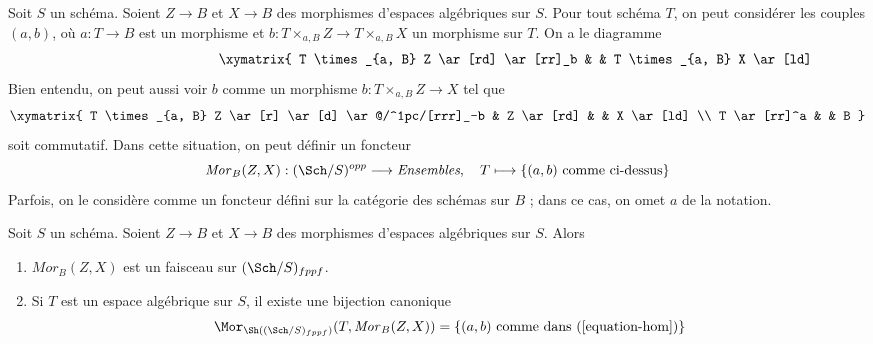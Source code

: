 \medskip\noindent
Soit $S$ un schéma. Soient $Z \to B$ et $X \to B$ des morphismes
d'espaces algébriques sur $S$. Pour tout schéma $T$, on peut considérer les couples
$(a, b)$, où $a : T \to B$
est un morphisme et $b : T \times_{a, B} Z \to T \times_{a, B} X$
un morphisme sur $T$. On a le diagramme
\begin{equation}
\label{equation-hom}
\vcenter{
\xymatrix{
T \times_{a, B} Z \ar[rd] \ar[rr]_b & &
T \times_{a, B} X \ar[ld] & Z \ar[rd] & & X \ar[ld] \\
& T \ar[rrr]^a & & & B
}
}
\end{equation}
Bien entendu, on peut aussi voir $b$ comme un morphisme
$b : T \times_{a, B} Z \to X$ tel que
$$
\xymatrix{
T \times_{a, B} Z \ar[r] \ar[d] \ar@/^1pc/[rrr]_-b &
Z \ar[rd] & & X \ar[ld] \\
T \ar[rr]^a & & B
}
$$
soit commutatif. Dans cette situation, on peut définir un foncteur
\begin{equation}
\label{equation-hom-functor}
\mathit{Mor}_B(Z, X) : (\Sch/S)^{opp} \longrightarrow \textit{Ensembles},
\quad
T \longmapsto \{(a, b)\text{ comme ci-dessus}\}
\end{equation}
Parfois, on le considère comme un foncteur défini sur la catégorie
des schémas sur $B$ ; dans ce cas, on omet $a$ de la notation.

\begin{lemma}
\label{lemma-hom-functor-sheaf}
Soit $S$ un schéma. Soient $Z \to B$ et $X \to B$ des morphismes
d'espaces algébriques sur $S$. Alors
\begin{enumerate}
\item $\mathit{Mor}_B(Z, X)$ est un faisceau sur
$(\Sch/S)_{fppf}$.
\item Si $T$ est un espace algébrique sur $S$, il existe une
bijection canonique
$$
\Mor_{\Sh((\Sch/S)_{fppf})}(T, \mathit{Mor}_B(Z, X))
=
\{(a, b)\text{ comme dans }(\ref{equation-hom})\}
$$
\end{enumerate}
\end{lemma}

